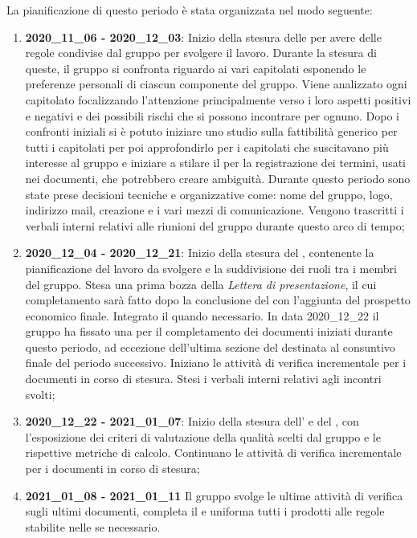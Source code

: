 La pianificazione di questo periodo è stata organizzata nel modo seguente:
\begin{enumerate}
\item \textbf{2020\_11\_06 - 2020\_12\_03}:
Inizio della stesura delle {\NdP} per avere delle regole condivise dal gruppo per svolgere il lavoro. Durante la stesura di queste, il gruppo si confronta riguardo ai vari capitolati esponendo le preferenze personali di ciascun componente del gruppo. Viene analizzato ogni capitolato focalizzando l'attenzione principalmente verso i loro aspetti positivi e negativi e dei possibili rischi che si possono incontrare per ognuno. Dopo i confronti iniziali si è potuto iniziare uno studio sulla fattibilità generico per tutti i capitolati per poi approfondirlo per i capitolati che suscitavano più interesse al gruppo e iniziare a stilare il {\Glossario} per la registrazione dei termini, usati nei documenti, che potrebbero creare ambiguità. Durante questo periodo sono state prese decisioni tecniche e organizzative come: nome del gruppo, logo, indirizzo mail, creazione  e i vari mezzi di comunicazione. Vengono trascritti i verbali interni relativi alle riunioni del gruppo durante questo arco di tempo;
\item \textbf{2020\_12\_04 - 2020\_12\_21}:
Inizio della stesura del {\PdP}, contenente la pianificazione del lavoro da svolgere e la suddivisione dei ruoli tra i membri del gruppo. Stesa una prima bozza della \textit{Lettera di presentazione}, il cui completamento sarà fatto dopo la conclusione del {\PdP} con l'aggiunta del prospetto economico finale. Integrato il {\Glossario} quando necessario. In data 2020\_12\_22 il gruppo ha fissato una  per il completamento dei documenti iniziati durante questo periodo, ad eccezione dell'ultima sezione del {\PdP} destinata al consuntivo finale del periodo successivo. Iniziano le attività di verifica incrementale per i documenti in corso di stesura. Stesi i verbali interni relativi agli incontri svolti;
\item \textbf{2020\_12\_22 - 2021\_01\_07}:
Inizio della stesura dell'{\AdR} e del {\PdQ}, con l'esposizione dei criteri di valutazione della qualità scelti dal gruppo e le rispettive metriche di calcolo. Continuano le attività di verifica incrementale per i documenti in corso di stesura;
\item \textbf{2021\_01\_08 - 2021\_01\_11}
Il gruppo svolge le ultime attività di verifica sugli ultimi documenti, completa il {\Glossario} e uniforma tutti i prodotti alle regole stabilite nelle {\NdP} se necessario.
\end{enumerate}
